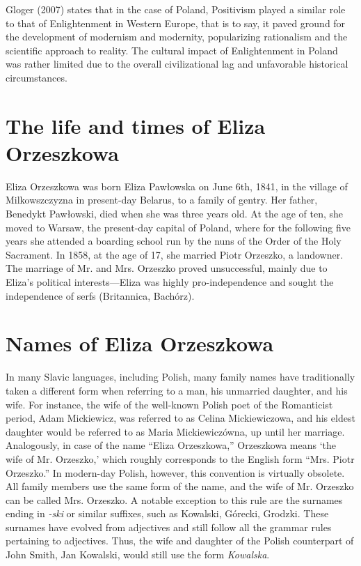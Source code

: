Gloger (2007) states that in the case of Poland, Positivism played a similar role to that of Enlightenment in Western Europe, that is to say, it paved ground for the development of modernism and modernity, popularizing rationalism and the scientific approach to reality. The cultural impact of Enlightenment in Poland was rather limited due to the overall civilizational lag and unfavorable historical circumstances.

\section{The life and times of Eliza Orzeszkowa}

Eliza Orzeszkowa was born Eliza Pawłowska on June 6th, 1841, in the village of Milkowszczyzna in present-day Belarus, to a family of gentry. Her father, Benedykt Pawłowski, died when she was three years old. 
At the age of ten, she moved to Warsaw, the present-day capital of Poland, where for the following five years she attended a boarding school run by the nuns of the Order of the Holy Sacrament.
In 1858, at the age of 17, she married Piotr Orzeszko, a landowner.
The marriage of Mr. and Mrs. Orzeszko proved unsuccessful, mainly due to Eliza's political interests---Eliza was highly pro-independence and sought the independence of serfs (Britannica, Bachórz).

\section{Names of Eliza Orzeszkowa}
In many Slavic languages, including Polish, many family names have traditionally taken a different form when referring to a man, his unmarried daughter, and his wife.
For instance, the wife of the well-known Polish poet of the Romanticist period, Adam Mickiewicz, was referred to as Celina Mickiewiczowa, and his eldest daughter would be referred to as Maria Mickiewiczówna, up until her marriage.
Analogously, in case of the name ``Eliza Orzeszkowa,'' Orzeszkowa means `the wife of Mr. Orzeszko,' which roughly corresponds to the English form ``Mrs. Piotr Orzeszko.''
In modern-day Polish, however, this convention is virtually obsolete.
All family members use the same form of the name, and the wife of Mr. Orzeszko can be called Mrs. Orzeszko.
A notable exception to this rule are the surnames ending in \textit{-ski} or similar suffixes, such as Kowalski, Górecki, Grodzki.
These surnames have evolved from adjectives and still follow all the grammar rules pertaining to adjectives.
Thus, the wife and daughter of the Polish counterpart of John Smith, Jan Kowalski, would still use the form \textit{Kowalska}. 

